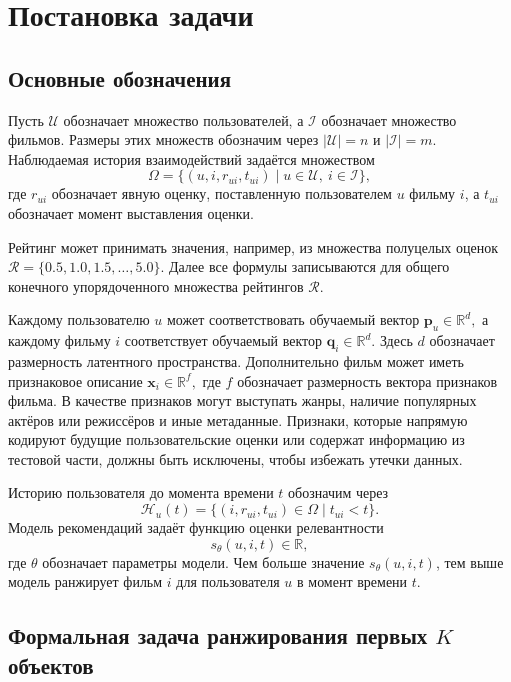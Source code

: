 \documentclass[12pt,fleqn]{article}
\begin{document}
\section{Постановка задачи}
\label{sec:problem}

\subsection{Основные обозначения}

Пусть $\mathcal{U}$ обозначает множество пользователей, а $\mathcal{I}$ обозначает множество фильмов. Размеры этих множеств обозначим через $|\mathcal{U}|=n$ и $|\mathcal{I}|=m$. Наблюдаемая история взаимодействий задаётся множеством
$$
    \Omega =
    \{(u,i,r_{ui},t_{ui}) \mid u \in \mathcal{U},\ i \in \mathcal{I}\},
$$
где $r_{ui}$ обозначает явную оценку, поставленную пользователем $u$ фильму $i$, а $t_{ui}$ обозначает момент выставления оценки.

Рейтинг может принимать значения, например, из множества полуцелых оценок
$
    \mathcal{R}=\{0.5,1.0,1.5,\ldots,5.0\}.
$
Далее все формулы записываются для общего конечного упорядоченного множества рейтингов $\mathcal{R}$.

Каждому пользователю $u$ может соответствовать обучаемый вектор
$
    \mathbf{p}_u \in \mathbb{R}^{d},
$
а каждому фильму $i$ соответствует обучаемый вектор
$
    \mathbf{q}_i \in \mathbb{R}^{d}.
$
Здесь $d$ обозначает размерность латентного пространства. Дополнительно фильм может иметь признаковое описание
$
    \mathbf{x}_i \in \mathbb{R}^{f},
$
где $f$ обозначает размерность вектора признаков фильма. В качестве признаков могут выступать жанры, наличие популярных актёров или режиссёров и иные метаданные. Признаки, которые напрямую кодируют будущие пользовательские оценки или содержат информацию из тестовой части, должны быть исключены, чтобы избежать утечки данных.

Историю пользователя до момента времени $t$ обозначим через
$$
    \mathcal{H}_u(t)=
    \{(i,r_{ui},t_{ui}) \in \Omega \mid t_{ui}<t\}.
$$
Модель рекомендаций задаёт функцию оценки релевантности
$$
    s_{\theta}(u,i,t) \in \mathbb{R},
$$
где $\theta$ обозначает параметры модели. Чем больше значение $s_{\theta}(u,i,t)$, тем выше модель ранжирует фильм $i$ для пользователя $u$ в момент времени $t$.

\subsection{Формальная задача ранжирования первых $K$ объектов}
\end{document}
